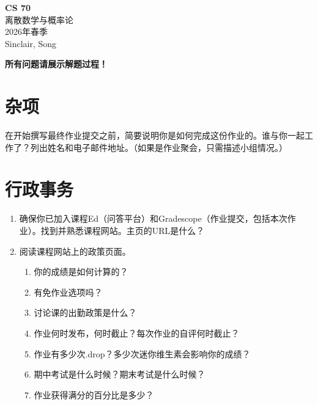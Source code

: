 \documentclass[11pt]{article}
\begin{document}
\begin{center}
{\Large\bfseries CS 70}\\[0.2em]
离散数学与概率论\\[0.1em]
2026年春季\\[0.1em]
Sinclair, Song\\[0.5em]
\end{center}

\vspace{0.5em}
\textbf{所有问题请展示解题过程！}

\section*{杂项}
在开始撰写最终作业提交之前，简要说明你是如何完成这份作业的。谁与你一起工作了？列出姓名和电子邮件地址。（如果是作业聚会，只需描述小组情况。）

\section*{行政事务}
\begin{enumerate}
  \item 确保你已加入课程Ed（问答平台）和Gradescope（作业提交，包括本次作业）。找到并熟悉课程网站。主页的URL是什么？
  \item 阅读课程网站上的政策页面。
  \begin{enumerate}
    \item 你的成绩是如何计算的？
    \item 有免作业选项吗？
    \item 讨论课的出勤政策是什么？
    \item 作业何时发布，何时截止？每次作业的自评何时截止？
    \item 作业有多少次.drop？多少次迷你维生素会影响你的成绩？
    \item 期中考试是什么时候？期末考试是什么时候？
    \item 作业获得满分的百分比是多少？
  \end{enumerate}
\end{enumerate}
\end{document}
